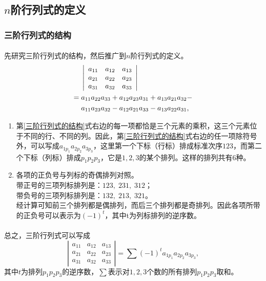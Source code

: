 \subsection{$n$阶行列式的定义}
\subsubsection{三阶行列式的结构}
\paragraph{}
先研究三阶行列式的结构，然后推广到$n$阶行列式的定义。
\begin{align}
\centering
  \begin{split}
    \label{三阶行列式的结构}
    &\;\left|\begin{array}{ccc}
      a_{11} & a_{12} & a_{13} \\
      a_{21} & a_{22} & a_{23} \\
      a_{31} & a_{32} & a_{33}
    \end{array}\right| \\
    =&\; a_{11}a_{22}a_{33} + a_{12}a_{23}a_{31} + a_{13}a_{21}a_{32} - \\
    &\; a_{11}a_{23}a_{32} - a_{12}a_{21}a_{33} - a_{13}a_{22}a_{31},
  \end{split}
\end{align}

\begin{enumerate}[label=\alph*)]
  \item 第\eqref{三阶行列式的结构}式右边的每一项都恰是三个元素的乘积，这三个元素位于不同的行、不同的列。因此，第\eqref{三阶行列式的结构}式右边的任一项除符号外，可以写成$a_{1p_1}a_{2p_2}a_{3p_3}$，这里第一个下标（行标）排成标准次序$123$，而第二个下标（列标）排成$p_1p_2p_3$，它是$1,2,3$的某个排列。这样的排列共有$6$种。
  \item 各项的正负号与列标的奇偶排列对照。
  \\带正号的三项列标排列是：$123, \; 231, \; 312$；
  \\带负号的三项列标排列是：$132, \; 213, \; 321$。
  \\经计算可知前三个排列都是偶排列，而后三个排列都是奇排列。因此各项所带的正负号可以表示为$(-1)^t$，其中t为列标排列的逆序数。
\end{enumerate}

\paragraph{}
总之，三阶行列式可以写成
\begin{equation*}
  \left|\begin{array}{ccc}
    a_{11} & a_{12} & a_{13} \\
    a_{21} & a_{22} & a_{23} \\
    a_{31} & a_{32} & a_{33}
  \end{array}\right| = \sum(-1)^ta_{1p_1}a_{2p_2}a_{3p_3},
\end{equation*}
其中$t$为排列$p_1p_2p_3$的逆序数，$\sum$表示对$1,2,3$个数的所有排列$p_1p_2p_3$取和。

